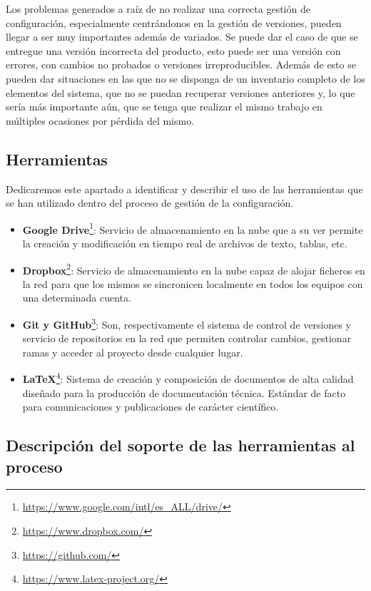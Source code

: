 \bigskip

Los problemas generados a raíz de no realizar una correcta gestión de configuración, especialmente centrándonos en la gestión de versiones, pueden llegar a ser muy importantes además de variados. Se puede dar el caso de que se entregue una versión incorrecta del producto, esto puede ser una versión con errores, con cambios no probados o versiones irreproducibles. Además de esto se pueden dar situaciones en las que no se disponga de un inventario completo de los elementos del sistema, que no se puedan recuperar versiones anteriores y, lo que sería más importante aún, que se tenga que realizar el mismo trabajo en múltiples ocasiones por pérdida del mismo. 


\subsection{Herramientas}

Dedicaremos este apartado a identificar y describir el uso de las herramientas que se han utilizado dentro del proceso de gestión de la configuración.

\begin{itemize}
	\item \textbf{Google Drive}\footnote{\url{https://www.google.com/intl/es\_ALL/drive/}}: Servicio de almacenamiento en la nube que a su ver permite la creación y modificación en tiempo real de archivos de texto, tablas, etc.
	\item \textbf{Dropbox}\footnote{\url{https://www.dropbox.com/}}: Servicio de almacenamiento en la nube capaz de alojar ficheros en la red para que los mismos se sincronicen localmente en todos los equipos con una determinada cuenta.
	\item \textbf{Git y GitHub}\footnote{\url{https://github.com/}}: Son, respectivamente el sistema de control de versiones y servicio de repositorios en la red que permiten controlar cambios, gestionar ramas y acceder al proyecto desde cualquier lugar.
	\item \textbf{LaTeX}\footnote{\url{https://www.latex-project.org/}}: Sistema de creación y composición de documentos de alta calidad diseñado para la producción de documentación técnica. Estándar de facto para comunicaciones y publicaciones de carácter científico.
\end{itemize}

\subsection{Descripción del soporte de las herramientas al proceso}

